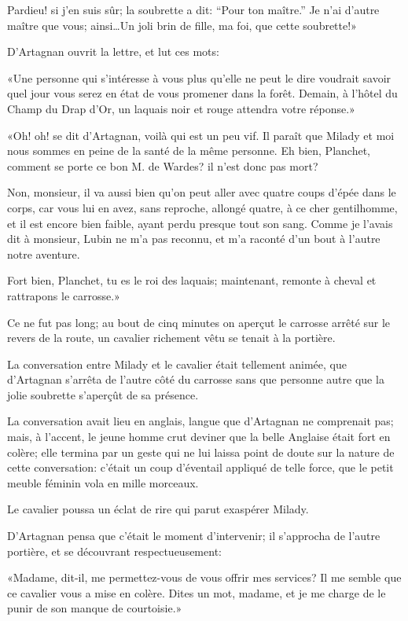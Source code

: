 \speak  Pardieu! si j'en suis sûr; la soubrette a dit: “Pour ton maître.” Je n'ai d'autre maître que vous; ainsi\dots Un joli brin de fille, ma foi, que cette soubrette!» 

D'Artagnan ouvrit la lettre, et lut ces mots: 

«Une personne qui s'intéresse à vous plus qu'elle ne peut le dire voudrait savoir quel jour vous serez en état de vous promener dans la forêt. Demain, à l'hôtel du Champ du Drap d'Or, un laquais noir et rouge attendra votre réponse.» 

«Oh! oh! se dit d'Artagnan, voilà qui est un peu vif. Il paraît que Milady et moi nous sommes en peine de la santé de la même personne. Eh bien, Planchet, comment se porte ce bon M. de Wardes? il n'est donc pas mort? 

\speak  Non, monsieur, il va aussi bien qu'on peut aller avec quatre coups d'épée dans le corps, car vous lui en avez, sans reproche, allongé quatre, à ce cher gentilhomme, et il est encore bien faible, ayant perdu presque tout son sang. Comme je l'avais dit à monsieur, Lubin ne m'a pas reconnu, et m'a raconté d'un bout à l'autre notre aventure. 

\speak  Fort bien, Planchet, tu es le roi des laquais; maintenant, remonte à cheval et rattrapons le carrosse.» 

Ce ne fut pas long; au bout de cinq minutes on aperçut le carrosse arrêté sur le revers de la route, un cavalier richement vêtu se tenait à la portière. 

La conversation entre Milady et le cavalier était tellement animée, que d'Artagnan s'arrêta de l'autre côté du carrosse sans que personne autre que la jolie soubrette s'aperçût de sa présence. 

La conversation avait lieu en anglais, langue que d'Artagnan ne comprenait pas; mais, à l'accent, le jeune homme crut deviner que la belle Anglaise était fort en colère; elle termina par un geste qui ne lui laissa point de doute sur la nature de cette conversation: c'était un coup d'éventail appliqué de telle force, que le petit meuble féminin vola en mille morceaux. 

Le cavalier poussa un éclat de rire qui parut exaspérer Milady. 

D'Artagnan pensa que c'était le moment d'intervenir; il s'approcha de l'autre portière, et se découvrant respectueusement: 

«Madame, dit-il, me permettez-vous de vous offrir mes services? Il me semble que ce cavalier vous a mise en colère. Dites un mot, madame, et je me charge de le punir de son manque de courtoisie.» 


